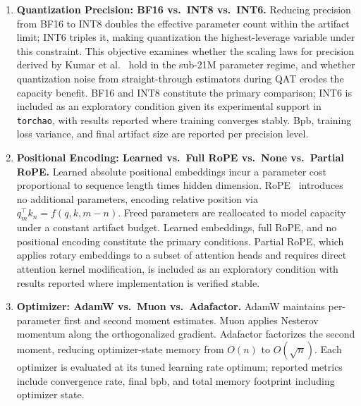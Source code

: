 \documentclass[12pt, letterpaper]{article}
\begin{document}
\begin{enumerate}[leftmargin=*, label=\textbf{O\arabic*.}]

    \item \textbf{Quantization Precision: BF16 vs.\ INT8
    vs.\ INT6.}
    Reducing precision from BF16 to INT8 doubles the effective
    parameter count within the artifact limit; INT6 triples it,
    making quantization the highest-leverage variable under
    this constraint. This objective examines whether the
    scaling laws for precision derived by Kumar et
    al.~\cite{scalingprecision} hold in the sub-21M parameter
    regime, and whether quantization noise from straight-through
    estimators during QAT erodes the capacity benefit. BF16
    and INT8 constitute the primary comparison; INT6 is
    included as an exploratory condition given its experimental
    support in \texttt{torchao}, with results reported where
    training converges stably. Bpb, training loss variance,
    and final artifact size are reported per precision level.

    \item \textbf{Positional Encoding: Learned vs.\ Full RoPE
    vs.\ None vs.\ Partial RoPE.}
    Learned absolute positional embeddings incur a parameter
    cost proportional to sequence length times hidden dimension.
    RoPE~\cite{rope} introduces no additional parameters,
    encoding relative position via
    $q_m^\top k_n = f(q,k,m-n)$. Freed parameters are
    reallocated to model capacity under a constant artifact
    budget. Learned embeddings, full RoPE, and no positional
    encoding constitute the primary conditions. Partial RoPE,
    which applies rotary embeddings to a subset of attention
    heads and requires direct attention kernel modification,
    is included as an exploratory condition with results
    reported where implementation is verified stable.

    \item \textbf{Optimizer: AdamW vs.\ Muon vs.\ Adafactor.}
    AdamW maintains per-parameter first and second moment
    estimates. Muon applies Nesterov momentum along the
    orthogonalized gradient. Adafactor factorizes the second
    moment, reducing optimizer-state memory from $O(n)$ to
    $O(\sqrt{n})$. Each optimizer is evaluated at its tuned
    learning rate optimum; reported metrics include
    convergence rate, final bpb, and total memory footprint
    including optimizer state.

\end{enumerate}
\end{document}
